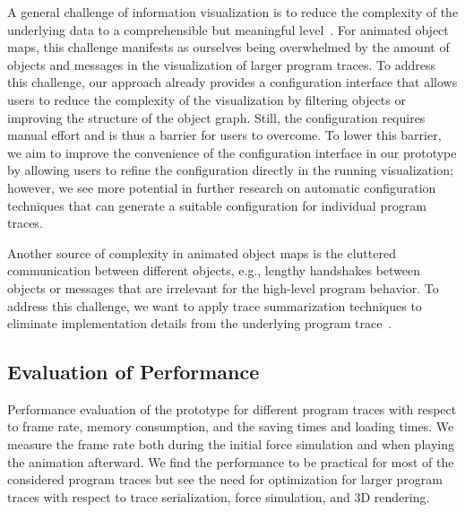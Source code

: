 A general challenge of information visualization is to reduce the complexity of the underlying data to a comprehensible but meaningful level~\cite{robertson2009scale}.
For animated object maps, this challenge manifests as ourselves being overwhelmed by the amount of objects and messages in the visualization of larger program traces.
To address this challenge, our approach already provides a configuration interface that allows users to reduce the complexity of the visualization by filtering objects or improving the structure of the object graph.
Still, the configuration requires manual effort and is thus a barrier for users to overcome.
To lower this barrier, we aim to improve the convenience of the configuration interface in our prototype by allowing users to refine the configuration directly in the running visualization; however, we see more potential in further research on automatic configuration techniques that can generate a suitable configuration for individual program traces.

Another source of complexity in animated object maps is the cluttered communication between different objects, e.g., lengthy handshakes between objects or messages that are irrelevant for the high-level program behavior.
To address this challenge, we want to apply trace summarization techniques to eliminate implementation details from the underlying program trace~\cite{hamouLhadj2006summarizing,noda2017identifying}.

\subsection{Evaluation of Performance}

\begin{table*}
	\centering
	\caption{
		Performance evaluation of the \tfd{} prototype for different program traces with respect to frame rate, memory consumption, and the saving times and loading times.
		We measure the frame rate both during the initial force simulation and when playing the animation afterward.
		We find the performance to be practical for most of the considered program traces but see the need for optimization for larger program traces with respect to trace serialization, force simulation, and 3D rendering.
	}
	\label{tab:discussion/performance}
	\begin{threeparttable}
		\centering
		{\footnotesize
		}
	\end{threeparttable}
\end{table*}

